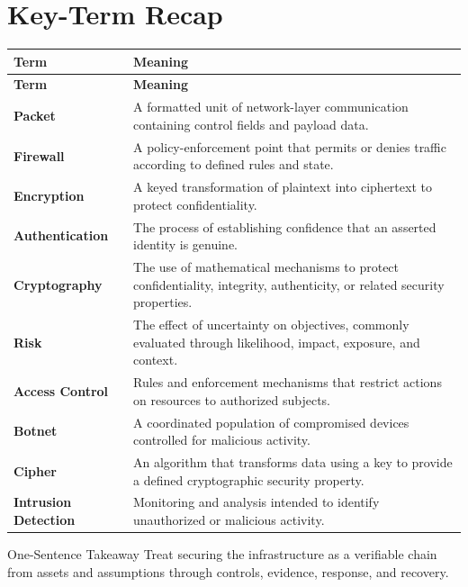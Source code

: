 \documentclass[11pt,letterpaper]{article}
\begin{document}
\section*{Key-Term Recap}
\begin{longtable}{>{\raggedright\arraybackslash}p{}>{\raggedright\arraybackslash}p{}}
\toprule\rowcolor{Navy}\color{white}\textbf{Term} & \color{white}\textbf{Meaning}\\\midrule
\endfirsthead
\toprule\rowcolor{Navy}\color{white}\textbf{Term} & \color{white}\textbf{Meaning}\\\midrule
\endhead
\textbf{Packet} & A formatted unit of network-layer communication containing control fields and payload data. \\\midrule
\textbf{Firewall} & A policy-enforcement point that permits or denies traffic according to defined rules and state. \\\midrule
\textbf{Encryption} & A keyed transformation of plaintext into ciphertext to protect confidentiality. \\\midrule
\textbf{Authentication} & The process of establishing confidence that an asserted identity is genuine. \\\midrule
\textbf{Cryptography} & The use of mathematical mechanisms to protect confidentiality, integrity, authenticity, or related security properties. \\\midrule
\textbf{Risk} & The effect of uncertainty on objectives, commonly evaluated through likelihood, impact, exposure, and context. \\\midrule
\textbf{Access Control} & Rules and enforcement mechanisms that restrict actions on resources to authorized subjects. \\\midrule
\textbf{Botnet} & A coordinated population of compromised devices controlled for malicious activity. \\\midrule
\textbf{Cipher} & An algorithm that transforms data using a key to provide a defined cryptographic security property. \\\midrule
\textbf{Intrusion Detection} & Monitoring and analysis intended to identify unauthorized or malicious activity. \\\midrule
\bottomrule
\end{longtable}
\begin{CornellExamBox}{One-Sentence Takeaway}
Treat securing the infrastructure as a verifiable chain from assets and assumptions through controls, evidence, response, and recovery.
\end{CornellExamBox}
\end{document}
